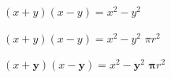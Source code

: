 \documentclass[a4paper]{article}
\begin{document}
$(x+y)(x-y)=x^2-y^2$

{\boldmath $(x+y)(x-y)=x^{2}-y^{2}$ $ \pi r^2$}

$(x+\mathbf{y})(x-\mathbf{y})=x^{2}-{\mathbf{y}}^{2}$
$\mathbf{\pi} r^2$
\end{document}
